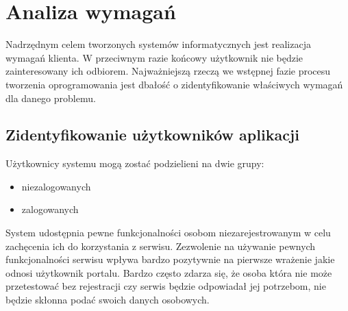 \chapter{Analiza wymagań}
\label{cha:inzyneriaWymagan}
Nadrzędnym celem tworzonych systemów informatycznych jest realizacja wymagań klienta. W przeciwnym razie końcowy użytkownik nie będzie zainteresowany ich odbiorem. Najważniejszą rzeczą we wstępnej fazie procesu tworzenia oprogramowania jest dbałość o zidentyfikowanie właściwych wymagań dla danego problemu.

\section{Zidentyfikowanie użytkowników aplikacji}
\label{sec:uzytkownicy}
Użytkownicy systemu mogą zostać podzielieni na dwie grupy:
\begin{itemize}
\item niezalogowanych
\item zalogowanych
\end{itemize}
System udostępnia pewne funkcjonalności osobom niezarejestrowanym w celu zachęcenia ich do korzystania z serwisu. Zezwolenie na używanie pewnych funkcjonalności serwisu wpływa bardzo pozytywnie na pierwsze wrażenie jakie odnosi użytkownik portalu. Bardzo często zdarza się, że osoba która nie może przetestować bez rejestracji czy serwis będzie odpowiadał jej potrzebom, nie będzie skłonna podać swoich danych osobowych.

